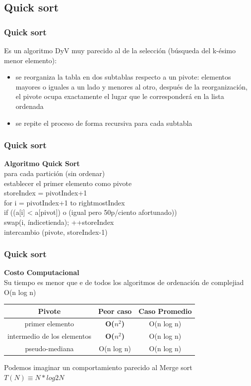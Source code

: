 \documentclass{beamer}
\begin{document}
\subsection{Quick sort}
  \begin{frame}
 \frametitle{Quick sort}
    \begin{block}{}
Es un algoritmo DyV muy parecido al de la selección (búsqueda del k-ésimo menor elemento):
\begin{itemize}
    \item se reorganiza la tabla en dos subtablas respecto a un pivote: elementos mayores o iguales a un lado y menores al otro, después de la reorganización, el pivote ocupa exactamente el lugar que le corresponderá en la lista ordenada
    \item se repite el proceso de forma recursiva para cada subtabla
\end{itemize}
  \end{block}  
\end{frame}
\begin{frame}
 \frametitle{Quick sort}
    \begin{block}{}
\textbf{Algoritmo Quick Sort}\\

\tab para cada partición (sin ordenar)\\
\tab establecer el primer elemento como pivote\\
\tab\tab   storeIndex = pivotIndex+1\\
\tab\tab   for i = pivotIndex+1 to rightmostIndex\\
\tab\tab\tab     if ((a[i] < a[pivot]) o (igual pero 50p/ciento afortunado))\\
\tab\tab       swap(i, índicetienda); ++storeIndex\\
\tab   intercambio (pivote, storeIndex-1)\\
  \end{block}  
\end{frame}
  \begin{frame}
 \frametitle{Quick sort}
    \begin{block}{}
\textbf{Costo Computacional}\\
Su tiempo es menor que e de todos los algoritmos de ordenación de complejiad O(n log n)
\begin{center}
   \begin{tabular}{|c|c|c|}
\hline 
\textbf{Pivote} & \textbf{Peor caso} & \textbf{Caso Promedio}\tabularnewline
\hline 
primer elemento & \textbf{O($n^2$)} & O(n log n)\tabularnewline\hline 
intermedio de los elementos & \textbf{O($n^2$)} & O(n log n)\tabularnewline\hline 
pseudo-mediana & O(n log n) & O(n log n)\tabularnewline\hline 
\end{tabular} 
\end{center}
Podemos imaginar un comportamiento parecido al Merge sort\\
$T(N) \equiv N * log2 N$
  \end{block}  
\end{frame}
\end{document}
